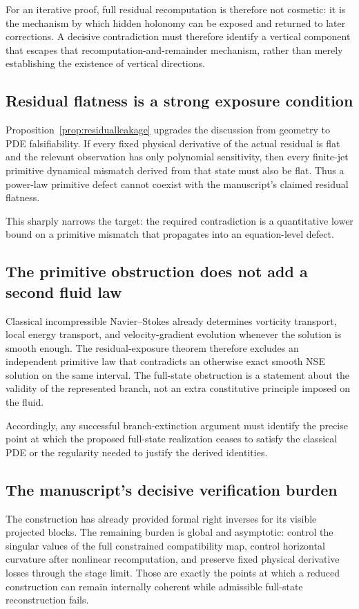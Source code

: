 \documentclass[12pt]{article}
\begin{document}
For an iterative proof, full residual recomputation is therefore not cosmetic: it is the mechanism by which hidden holonomy can be exposed and returned to later corrections. A decisive contradiction must therefore identify a vertical component that escapes that recomputation-and-remainder mechanism, rather than merely establishing the existence of vertical directions.

\subsection{Residual flatness is a strong exposure condition}
Proposition~\ref{prop:residualleakage} upgrades the discussion from geometry to PDE falsifiability. If every fixed physical derivative of the actual residual is flat and the relevant observation has only polynomial sensitivity, then every finite-jet primitive dynamical mismatch derived from that state must also be flat. Thus a power-law primitive defect cannot coexist with the manuscript's claimed residual flatness.

This sharply narrows the target: the required contradiction is a quantitative lower bound on a primitive mismatch that propagates into an equation-level defect.

\subsection{The primitive obstruction does not add a second fluid law}
Classical incompressible Navier--Stokes already determines vorticity transport, local energy transport, and velocity-gradient evolution whenever the solution is smooth enough. The residual-exposure theorem therefore excludes an independent primitive law that contradicts an otherwise exact smooth NSE solution on the same interval. The full-state obstruction is a statement about the validity of the represented branch, not an extra constitutive principle imposed on the fluid.

Accordingly, any successful branch-extinction argument must identify the precise point at which the proposed full-state realization ceases to satisfy the classical PDE or the regularity needed to justify the derived identities.

\subsection{The manuscript's decisive verification burden}
The construction has already provided formal right inverses for its visible projected blocks. The remaining burden is global and asymptotic: control the singular values of the full constrained compatibility map, control horizontal curvature after nonlinear recomputation, and preserve fixed physical derivative losses through the stage limit. Those are exactly the points at which a reduced construction can remain internally coherent while admissible full-state reconstruction fails.
\end{document}

